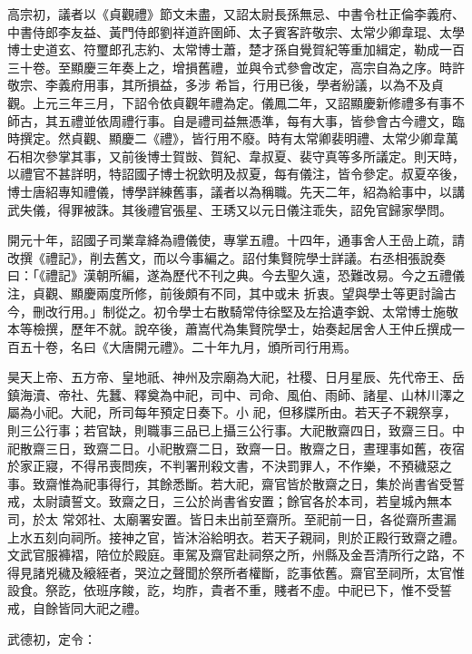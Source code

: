 \begin{pinyinscope}
 高宗初，議者以《貞觀禮》節文未盡，又詔太尉長孫無忌、中書令杜正倫李義府、中書侍郎李友益、黃門侍郎劉祥道許圉師、太子賓客許敬宗、太常少卿韋琨、太學博士史道玄、符璽郎孔志約、太常博士蕭，楚才孫自覺賀紀等重加緝定，勒成一百三十卷。至顯慶三年奏上之，增損舊禮，並與令式參會改定，高宗自為之序。時許敬宗、李義府用事，其所損益，多涉
 希旨，行用已後，學者紛議，以為不及貞觀。上元三年三月，下詔令依貞觀年禮為定。儀鳳二年，又詔顯慶新修禮多有事不師古，其五禮並依周禮行事。自是禮司益無憑準，每有大事，皆參會古今禮文，臨時撰定。然貞觀、顯慶二《禮》，皆行用不廢。時有太常卿裴明禮、太常少卿韋萬石相次參掌其事，又前後博士賀敱、賀紀、韋叔夏、裴守真等多所議定。則天時，以禮官不甚詳明，特詔國子博士祝欽明及叔夏，每有儀注，皆令參定。叔夏卒後，
 博士唐紹專知禮儀，博學詳練舊事，議者以為稱職。先天二年，紹為給事中，以講武失儀，得罪被誅。其後禮官張星、王琇又以元日儀注乖失，詔免官歸家學問。



 開元十年，詔國子司業韋絳為禮儀使，專掌五禮。十四年，通事舍人王嵒上疏，請改撰《禮記》，削去舊文，而以今事編之。詔付集賢院學士詳議。右丞相張說奏曰：「《禮記》漢朝所編，遂為歷代不刊之典。今去聖久遠，恐難改易。今之五禮儀注，貞觀、顯慶兩度所修，前後頗有不同，其中或未
 折衷。望與學士等更討論古今，刪改行用。」制從之。初令學士右散騎常侍徐堅及左拾遺李銳、太常博士施敬本等檢撰，歷年不就。說卒後，蕭嵩代為集賢院學士，始奏起居舍人王仲丘撰成一百五十卷，名曰《大唐開元禮》。二十年九月，頒所司行用焉。



 昊天上帝、五方帝、皇地祇、神州及宗廟為大祀，社稷、日月星辰、先代帝王、岳鎮海瀆、帝社、先蠶、釋奠為中祀，司中、司命、風伯、雨師、諸星、山林川澤之屬為小祀。大祀，所司每年預定日奏下。小
 祀，但移牒所由。若天子不親祭享，則三公行事；若官缺，則職事三品已上攝三公行事。大祀散齋四日，致齋三日。中祀散齋三日，致齋二日。小祀散齋二日，致齋一日。散齋之日，晝理事如舊，夜宿於家正寢，不得吊喪問疾，不判署刑殺文書，不決罰罪人，不作樂，不預穢惡之事。致齋惟為祀事得行，其餘悉斷。若大祀，齋官皆於散齋之日，集於尚書省受誓戒，太尉讀誓文。致齋之日，三公於尚書省安置；餘官各於本司，若皇城內無本司，於太
 常郊社、太廟署安置。皆日未出前至齋所。至祀前一日，各從齋所晝漏上水五刻向祠所。接神之官，皆沐浴給明衣。若天子親祠，則於正殿行致齋之禮。文武官服褲褶，陪位於殿庭。車駕及齋官赴祠祭之所，州縣及金吾清所行之路，不得見諸兇穢及縗絰者，哭泣之聲聞於祭所者權斷，訖事依舊。齋官至祠所，太官惟設食。祭訖，依班序餕，訖，均胙，貴者不重，賤者不虛。中祀已下，惟不受誓戒，自餘皆同大祀之禮。



 武德初，定令：




\end{pinyinscope}
